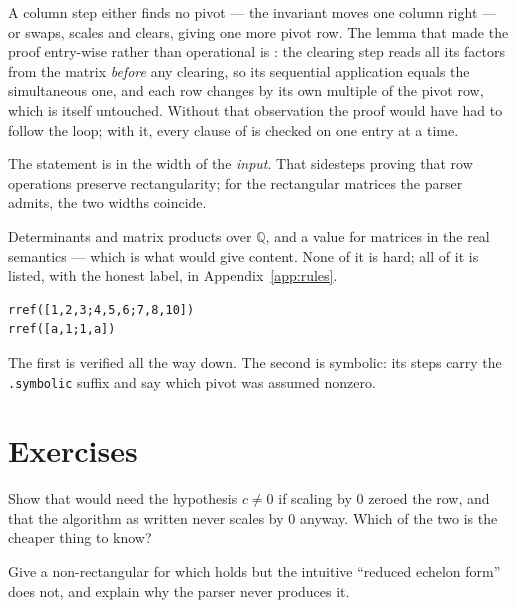 A column step either finds no pivot --- the invariant moves one column right --- or swaps, scales
and clears, giving one more pivot row. The lemma that made the proof entry-wise rather than
operational is : the clearing step reads all its factors from the matrix
\emph{before} any clearing, so its sequential application equals the simultaneous one, and each
row changes by its own multiple of the pivot row, which is itself untouched. Without that
observation the proof would have had to follow the loop; with it, every clause of  is
checked on one entry at a time.

The statement is in the width of the \emph{input}. That sidesteps proving that row operations
preserve rectangularity; for the rectangular matrices the parser admits, the two widths coincide.

\begin{logbox}
  Determinants and matrix products over $\mathbb{Q}$, and a value for matrices in the real
  semantics --- which is what would give  content. None of it is hard; all of it
  is listed, with the honest label, in Appendix~\ref{app:rules}.
\end{logbox}

\begin{trybox}
\begin{verbatim}
rref([1,2,3;4,5,6;7,8,10])
rref([a,1;1,a])
\end{verbatim}
  The first is verified all the way down. The second is symbolic: its steps carry the
  \texttt{.symbolic} suffix and say which pivot was assumed nonzero.
\end{trybox}

\section{Exercises}

\begin{exercisebox}
  Show that  would need the hypothesis $c \neq 0$ if scaling by $0$ zeroed the
  row, and that the algorithm as written never scales by $0$ anyway. Which of the two is the
  cheaper thing to know?
\end{exercisebox}

\begin{exercisebox}
  Give a non-rectangular  for which  holds but the
  intuitive ``reduced echelon form'' does not, and explain why the parser never produces it.
\end{exercisebox}
